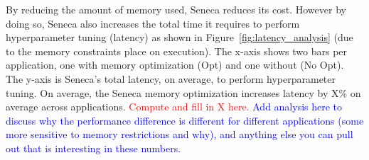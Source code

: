{By reducing the amount of memory used, Seneca reduces its cost.  However by doing so, Seneca also 
increases the total time it requires to perform hyperparameter tuning (latency) as shown 
in Figure~\ref{fig:latency_analysis} (due to the memory constraints place on execution).  The x-axis shows two bars per application, one with memory optimization (Opt) and one without (No Opt).  The y-axis is 
Seneca's total latency, on average, to perform hyperparameter tuning. 
On average, the Seneca memory optimization increases latency by X\% on average across applications.
\textcolor{red}{Compute and fill in X here.}
\textcolor{blue}{Add analysis here to discuss why the performance difference is different for different
applications (some more sensitive to memory restrictions and why), and anything else you can pull out that is interesting in these numbers.}


}
